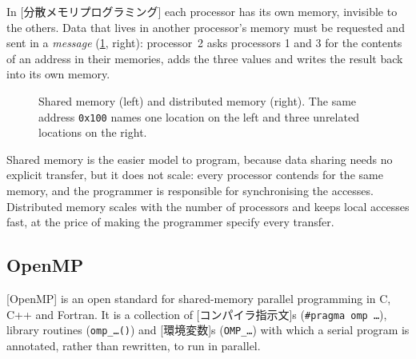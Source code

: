 \documentclass[../main.tex]{subfiles}
\begin{document}
\begin{definition}
  In [分散メモリプログラミング] each
  processor has its own memory, invisible to the others.  Data that lives
  in another processor's memory must be requested and sent in a
  \emph{message} (\cref{fig:l02-memory-models}, right): processor~2 asks
  processors 1 and 3 for the contents of an address in their memories,
  adds the three values and writes the result back into its own memory.
\end{definition}

\begin{figure}[tb]
  \centering
  
  \caption{Shared memory (left) and distributed memory (right).  The same
    address \texttt{0x100} names one location on the left and three
    unrelated locations on the right.}
  \label{fig:l02-memory-models}
\end{figure}


Shared memory is the easier model to program, because data sharing needs no
explicit transfer, but it does not scale: every processor contends for the
same memory, and the programmer is responsible for synchronising the
accesses.  Distributed memory scales with the number of processors and
keeps local accesses fast, at the price of making the programmer specify
every transfer.

\subsection{OpenMP}

\begin{definition}[OpenMP]
  [OpenMP] is an open standard for shared-memory parallel
  programming in C, C++ and Fortran.  It is a collection of
  [コンパイラ指示文]s (\texttt{\#pragma omp \ldots}),
  library routines (\texttt{omp\_\ldots()}) and
  [環境変数]s (\texttt{OMP\_\ldots}) with which
  a serial program is annotated, rather than rewritten, to run in
  parallel.
\end{definition}
\end{document}
